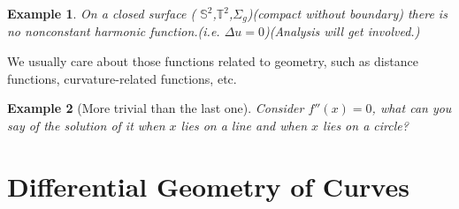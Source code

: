 \documentclass[UTF8,oneside,11pt]{book}
\theoremstyle{plain}\newtheorem{thm}{Theorem}
\theoremstyle{definition}\newtheorem{defn}[thm]{Definition}
\theoremstyle{plain}\newtheorem{axiom}[thm]{Axiom}
\theoremstyle{plain}\newtheorem{coro}[thm]{Corollary}
\theoremstyle{plain}\newtheorem{lemma}[thm]{Lemma}
\theoremstyle{plain}\newtheorem{prop}[thm]{Proposition}
\theoremstyle{plain}\newtheorem{conj}[thm]{Conjecture}
\theoremstyle{plain}\newtheorem{ques}[thm]{Problem}
\theoremstyle{plain}\newtheorem{const}[thm]{Construction}
\theoremstyle{remark}\newtheorem{notation}[thm]{Notation}
\theoremstyle{plain}\newtheorem*{app}{Application}
\theoremstyle{plain}\newtheorem*{exam}{Example}
\theoremstyle{plain}\newtheorem*{exer}{Exercise}
\theoremstyle{remark}\newtheorem*{remark}{Remark}
\theoremstyle{remark}\newtheorem*{note}{\small{Note}}
\numberwithin{equation}{section}
\numberwithin{thm}{section}
\begin{document}
\begin{exam}
    On a closed surface ( $\mathbb{S}^2$,$\mathbb{T}^2$,$\Sigma_g$)(compact without boundary) there is no nonconstant harmonic function.(i.e. $\Delta u=0$)(Analysis will get involved.)
\end{exam}
We usually care about those functions related to geometry, such as distance functions, curvature-related functions, etc.
\begin{exam}[More trivial than the last one]
    Consider $f''(x)=0$, what can you say of the solution of it when $x$ lies on a line and when $x$ lies on a circle?
\end{exam}

\chapter{Differential Geometry of Curves}
\end{document}
